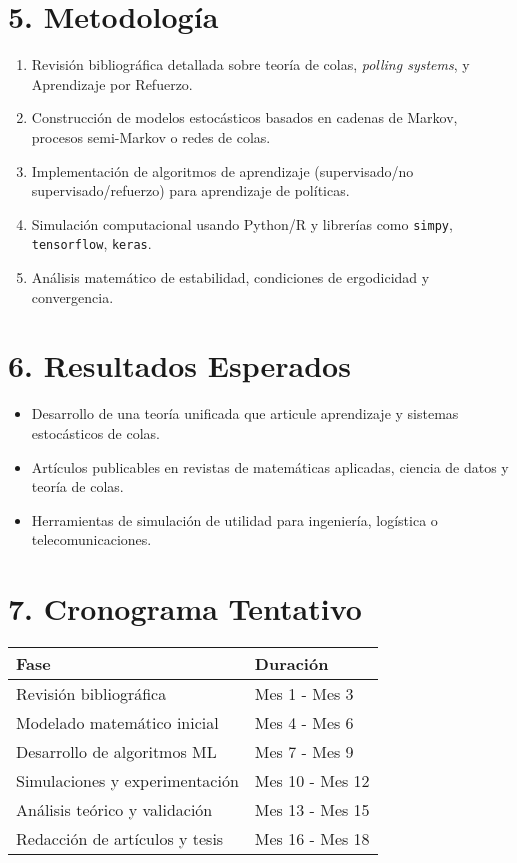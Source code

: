 \documentclass[12pt]{article}
\begin{document}
\section*{5. Metodolog\'ia}
\begin{enumerate}
  \item Revisi\'on bibliogr\'afica detallada sobre teor\'ia de colas, \textit{polling systems}, y Aprendizaje por Refuerzo.
  \item Construcci\'on de modelos estoc\'asticos basados en cadenas de Markov, procesos semi-Markov o redes de colas.
  \item Implementaci\'on de algoritmos de aprendizaje (supervisado/no supervisado/refuerzo) para aprendizaje de pol\'iticas.
  \item Simulaci\'on computacional usando Python/R y librer\'ias como \texttt{simpy}, \texttt{tensorflow}, \texttt{keras}.
  \item An\'alisis matem\'atico de estabilidad, condiciones de ergodicidad y convergencia.
\end{enumerate}

\section*{6. Resultados Esperados}
\begin{itemize}
  \item Desarrollo de una teor\'ia unificada que articule aprendizaje y sistemas estoc\'asticos de colas.
  \item Art\'iculos publicables en revistas de matem\'aticas aplicadas, ciencia de datos y teor\'ia de colas.
  \item Herramientas de simulaci\'on de utilidad para ingenier\'ia, log\'istica o telecomunicaciones.
\end{itemize}

\section*{7. Cronograma Tentativo}
\begin{tabular}{|l|l|}
\hline
\textbf{Fase} & \textbf{Duraci\'on} \\
\hline
Revisi\'on bibliogr\'afica & Mes 1 - Mes 3 \\
Modelado matem\'atico inicial & Mes 4 - Mes 6 \\
Desarrollo de algoritmos ML & Mes 7 - Mes 9 \\
Simulaciones y experimentaci\'on & Mes 10 - Mes 12 \\
An\'alisis te\'orico y validaci\'on & Mes 13 - Mes 15 \\
Redacci\'on de art\'iculos y tesis & Mes 16 - Mes 18 \\
\hline
\end{tabular}
\end{document}
